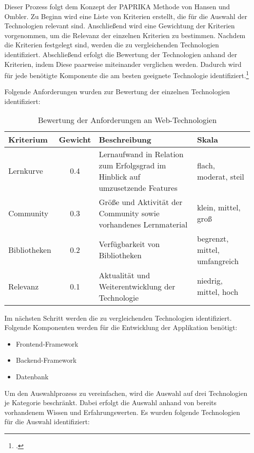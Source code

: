 Dieser Prozess folgt dem Konzept der PAPRIKA Methode von Hansen und Ombler.
Zu Beginn wird eine Liste von Kriterien erstellt, die für die Auswahl der Technologien relevant sind.
Anschließend wird eine Gewichtung der Kriterien vorgenommen, um die Relevanz der einzelnen Kriterien zu bestimmen.
Nachdem die Kriterien festgelegt sind, werden die zu vergleichenden Technologien identifiziert.
Abschließend erfolgt die Bewertung der Technologien anhand der Kriterien, indem Diese paarweise miteinander verglichen werden.
Dadurch wird für jede benötigte Komponente die am besten geeignete Technologie identifiziert.\footcite{Paprika2008}

Folgende Anforderungen wurden zur Bewertung der einzelnen Technologien identifiziert:

\begin{table}[htbp]
  \centering
  \begin{tabular}{|p{2cm}|c|p{5cm}|p{4cm}|}
      \hline
      \textbf{Kriterium} & \textbf{Gewicht} & \textbf{Beschreibung} & \textbf{Skala}\\ \hline
      {Lernkurve} & 0.4 & Lernaufwand in Relation zum Erfolgsgrad im Hinblick auf umzusetzende Features & flach, moderat, steil\\ \hline
      {Community} & 0.3 & Größe und Aktivität der Community sowie vorhandenes Lernmaterial & klein, mittel, groß\\ \hline
      {Bibliotheken} & 0.2 & Verfügbarkeit von Bibliotheken & begrenzt, mittel, umfangreich\\ \hline
      {Relevanz} & 0.1 & Aktualität und Weiterentwicklung der Technologie & niedrig, mittel, hoch\\ \hline
  \end{tabular}
  \caption{Bewertung der Anforderungen an Web-Technologien}\label{tab:table}
\end{table}

Im nächsten Schritt werden die zu vergleichenden Technologien identifiziert.
Folgende Komponenten werden für die Entwicklung der Applikation benötigt:

\begin{itemize}
  \item Frontend-Framework
  \item Backend-Framework
  \item Datenbank
\end{itemize}

Um den Auswahlprozess zu vereinfachen, wird die Auswahl auf drei Technologien je Kategorie beschränkt.
Dabei erfolgt die Auswahl anhand von bereits vorhandenem Wissen und Erfahrungswerten.
Es wurden folgende Technologien für die Auswahl identifiziert:

